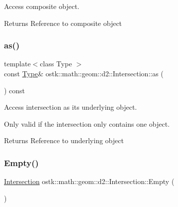 Access composite object. 

\begin{DoxyReturn}{Returns}
Reference to composite object 
\end{DoxyReturn}
\mbox{\label{classostk_1_1math_1_1geom_1_1d2_1_1_intersection_a296155743b25db7bbad1842a7a392e56}} 
\subsubsection{\texorpdfstring{as()}{as()}}
{\footnotesize\ttfamily template$<$class Type $>$ \\
const \hyperlink{classostk_1_1math_1_1geom_1_1d2_1_1_intersection_a8712ffbb37647ed5212ff8ba6da68b00}{Type}\& ostk\+::math\+::geom\+::d2\+::\+Intersection\+::as (\begin{DoxyParamCaption}{ }\end{DoxyParamCaption}) const\hspace{0.3cm}{\ttfamily [inline]}}



Access intersection as its underlying object. 

Only valid if the intersection only contains one object.

\begin{DoxyReturn}{Returns}
Reference to underlying object 
\end{DoxyReturn}
\mbox{\label{classostk_1_1math_1_1geom_1_1d2_1_1_intersection_a983cc8c0c63c6239d2c7f0448d6db252}} 
\subsubsection{\texorpdfstring{Empty()}{Empty()}}
{\footnotesize\ttfamily \hyperlink{classostk_1_1math_1_1geom_1_1d2_1_1_intersection}{Intersection} ostk\+::math\+::geom\+::d2\+::\+Intersection\+::\+Empty (\begin{DoxyParamCaption}{ }\end{DoxyParamCaption})\hspace{0.3cm}{\ttfamily [static]}}



